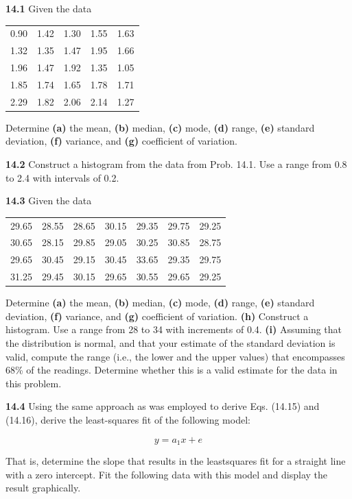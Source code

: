 \documentclass[../main.tex]{subfiles}
\begin{document}
\begin{multicols}{2}
    \noindent\textbf{14.1} Given the data

	\noindent \begin{tabular}{ c c c c c }
		0.90 & 1.42 & 1.30 & 1.55 & 1.63 \\
		1.32 & 1.35 & 1.47 & 1.95 & 1.66 \\
		1.96 & 1.47 & 1.92 & 1.35 & 1.05 \\
		1.85 & 1.74 & 1.65 & 1.78 & 1.71 \\
		2.29 & 1.82 & 2.06 & 2.14 & 1.27
	\end{tabular}

	\noindent Determine \textbf{(a)} the mean, \textbf{(b)} median, \textbf{(c)} mode, \textbf{(d)} range,
	\textbf{(e)} standard deviation, \textbf{(f)} variance, and \textbf{(g)} coefficient of
	variation.	


	\noindent\textbf{14.2}  Construct a histogram from the data from Prob. 14.1. Use a range from 0.8 to 2.4 with intervals of 0.2.

	\noindent\textbf{14.3} Given the data

	\noindent \begin{tabular}{c c c c c c c}
		29.65 & 28.55 & 28.65 & 30.15 & 29.35 & 29.75 & 29.25 \\
		30.65 & 28.15 & 29.85 & 29.05 & 30.25 & 30.85 & 28.75 \\
		29.65 & 30.45 & 29.15 & 30.45 & 33.65 & 29.35 & 29.75 \\
		31.25 & 29.45 & 30.15 & 29.65 & 30.55 & 29.65 & 29.25
	\end{tabular}

	\noindent Determine \textbf{(a)} the mean, \textbf{(b)} median, \textbf{(c)} mode, \textbf{(d)} range,
	\textbf{(e)} standard deviation, \textbf{(f)} variance, and \textbf{(g)} coefficient of
	variation.
	\textbf{(h)} Construct a histogram. Use a range from 28 to 34 with
	increments of 0.4.
	\textbf{(i)} Assuming that the distribution is normal, and that your
	estimate of the standard deviation is valid, compute the
	range (i.e., the lower and the upper values) that encompasses 68\% of the readings. Determine whether this is a
	valid estimate for the data in this problem.

	\noindent\textbf{14.4} Using the same approach as was employed to derive
	Eqs. (14.15) and (14.16), derive the least-squares fit of the
	following model:

	$$y = a_1 x + e$$

	\noindent That is, determine the slope that results in the leastsquares fit for a straight line with a zero intercept. Fit the following data with this model and display the result graphically.


\end{multicols}
\end{document}
